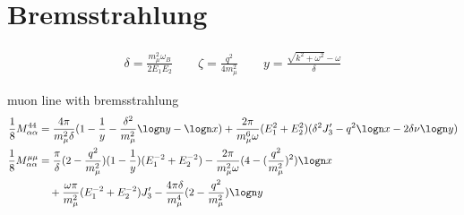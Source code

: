 \section{Bremsstrahlung}

\begin{align}
    \delta = \frac{m_\mu^2 \omega_B}{2 E_1 E_2}
    \qquad
    \zeta = \frac{q^2}{4 m_\mu^2}
    \qquad
    y = \frac{\sqrt{k^2 + \omega^2} - \omega}{\delta}
\end{align}

muon line with bremsstrahlung
\begin{align}
    \frac18 M_{\alpha\alpha}^{44} &= \frac{4\pi}{m_\mu^2 \delta} (1 - \frac{1}{y} - \frac{\delta^2}{m_\mu^2} \logn y - \logn x)
        + \frac{2\pi}{m_\mu^6 \omega}(E_1^2 + E_2^2)( \delta^2 J_3' - q^2 \logn x - 2 \delta \nu \logn y )
    \\
    \frac18 M_{\alpha\alpha}^{\mu\mu} &= \frac{\pi}{\delta} (2 - \frac{q^2}{m_\mu^2}) (1 - \frac1y) (E_1^{-2} + E_2^{-2})
        - \frac{2\pi}{m_\mu^2\omega} (4 - (\frac{q^2}{m_\mu^2})^2) \logn x 
        \\
        &\quad + \frac{\omega\pi}{m_\mu^2} (E_1^{-2} + E_2^{-2}) J_3' - \frac{4\pi\delta}{m_\mu^4}(2 - \frac{q^2}{m_\mu^2}) \logn y
\end{align}





